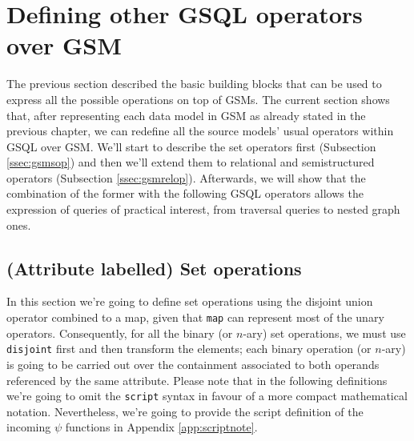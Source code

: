 
\section{Defining other GSQL operators over GSM}
The previous section described the basic building blocks that can be used to express all the possible operations on top of GSMs. The current section shows that, after representing each data model in GSM as already stated in the previous chapter, we can redefine all the source models' usual operators within GSQL over GSM. We'll start to describe the set operators first (Subsection \vref{ssec:gsmsop}) and then we'll extend them to relational and semistructured operators (Subsection \vref{ssec:gsmrelop}). Afterwards, we will show that the combination of the former with the following GSQL operators allows the expression of queries of practical interest, from traversal queries to nested graph ones.


\subsection{(Attribute labelled) Set operations}\label{ssec:gsmsop}
In this section we're going to define set operations using the disjoint union operator combined to a map, given that \texttt{map} can represent most of the unary operators. Consequently, for all the binary (or $n$-ary) set operations, we must use \texttt{disjoint} first and then transform the elements; each binary operation (or $n$-ary) is going to be carried out over the containment associated to both operands referenced by the same attribute. Please note that in the following definitions we're going to omit the \texttt{script} syntax in favour of a more compact mathematical notation. Nevertheless, we're going to provide the script definition of the incoming $\psi$ functions in Appendix \vref{app:scriptnote}.


